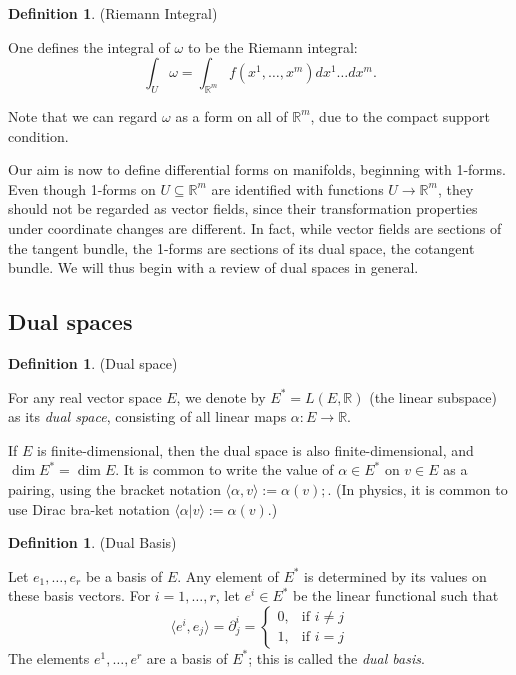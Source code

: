 \documentclass{article}
\theoremstyle{definition}
\newtheorem{defn}[theorem]{Definition}
\newenvironment{definition}
  {\vspace{8pt}\begin{mdframed}[backgroundcolor=blueish]\begin{defn}}
  {\end{defn}\end{mdframed}\vspace{4pt}}
\begin{document}
\begin{definition} (Riemann Integral)

One defines the integral of $\omega$ to be the Riemann integral:
\[ 
    \int_U \omega = \int_{\mathbb R^m} f(x^1 ,\dots, x^m )dx^1 \dots dx^m.
\]
\end{definition}

Note that we can regard $\omega$ as a form on all of $\mathbb R^m$, due to the compact support condition.

Our aim is now to define differential forms on manifolds, beginning with 1-forms. Even though 1-forms on $U \subseteq \mathbb R^m$ are identified with functions $U \rightarrow \mathbb R^m$, they should not be regarded as vector fields, since their transformation properties under coordinate changes are different. In fact, while vector fields are sections of the tangent bundle, the 1-forms are sections of its dual space, the cotangent bundle. We will thus begin with a review of dual spaces in general.

\subsection{Dual spaces}

\begin{definition} (Dual space)

For any real vector space $E$, we denote by $E^* = L(E,\mathbb R)$ (the linear subspace) as its \textit{dual space}, consisting of all linear maps $\alpha : E \rightarrow \mathbb R$.
\end{definition}

If $E$ is finite-dimensional, then the dual space is also finite-dimensional, and $\dim E^* = \dim E$. It is common to write the value of $\alpha \in E^*$ on $v \in E$ as a pairing, using the bracket notation  $\langle \alpha, v \rangle := \alpha(v);$. (In physics, it is common to use Dirac bra-ket notation $\langle \alpha | v \rangle := \alpha(v)$.)

\begin{definition} (Dual Basis)

Let $e_1,\dots, e_r$ be a basis of $E$. Any element of $E^*$ is determined by its values on these basis vectors. For $i = 1,\dots,r$, let $e^i \in E^*$ be the linear functional such that 
\[
    \langle e^i , e_j \rangle = \partial^i_j = 
    \begin{cases}
        0, & \text {if } i \neq j \\ 
        1, & \text{if } i = j
    \end{cases}
\]
The elements $e^1, \dots, e^r$ are a basis of $E^*$; this is called the \textit{dual basis}.
\end{definition}
\end{document}

